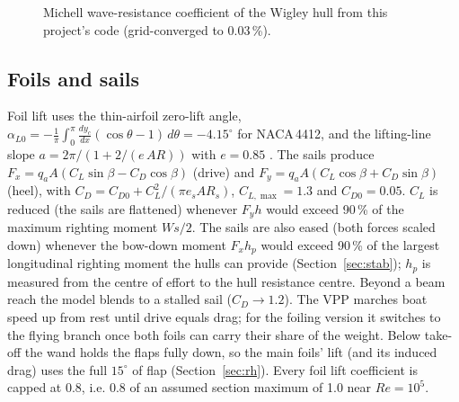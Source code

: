 \documentclass[10pt,twocolumn]{article}
\begin{document}
\begin{figure}[t]
\centering
{}
\caption{Michell wave-resistance coefficient of the Wigley hull from this project's code (grid-converged to 0.03\,\%).}
\label{fig:wigley}
\end{figure}

\subsection{Foils and sails}
Foil lift uses the thin-airfoil zero-lift angle, $\alpha_{L0}=-\frac1\pi\int_0^\pi \frac{dy_c}{dx}(\cos\theta-1)\,d\theta = -4.15^\circ$ for NACA\,4412, and the lifting-line slope $a=2\pi/(1+2/(e\,AR))$ with $e=0.85$ \cite{anderson}. The sails produce $F_x=q_aA(C_L\sin\beta-C_D\cos\beta)$ (drive) and $F_y=q_aA(C_L\cos\beta+C_D\sin\beta)$ (heel), with $C_D=C_{D0}+C_L^2/(\pi e_sAR_s)$, $C_{L,\max}=1.3$ and $C_{D0}=0.05$. $C_L$ is reduced (the sails are flattened) whenever $F_yh$ would exceed 90\,\% of the maximum righting moment $W s/2$. The sails are also eased (both forces scaled down) whenever the bow-down moment $F_xh_p$ would exceed 90\,\% of the largest longitudinal righting moment the hulls can provide (Section~\ref{sec:stab}); $h_p$ is measured from the centre of effort to the hull resistance centre. Beyond a beam reach the model blends to a stalled sail ($C_D\to1.2$). The VPP marches boat speed up from rest until drive equals drag; for the foiling version it switches to the flying branch once both foils can carry their share of the weight. Below take-off the wand holds the flaps fully down, so the main foils' lift (and its induced drag) uses the full $15^\circ$ of flap (Section~\ref{sec:rh}). Every foil lift coefficient is capped at 0.8, i.e. 0.8 of an assumed section maximum of 1.0 near $Re=10^5$.
\end{document}
